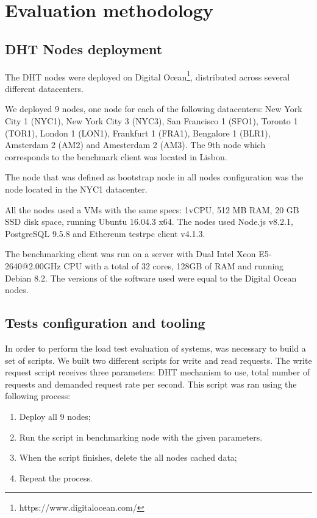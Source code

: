 \section{Evaluation methodology}
\label{section:methodology}

\subsection{DHT Nodes deployment}


The DHT nodes were deployed on Digital Ocean\footnote{https://www.digitalocean.com/}, distributed across several different datacenters.

We deployed 9 nodes, one node for each of the following datacenters: New York City 1 (NYC1), New York City 3 (NYC3), San Francisco 1 (SFO1), Toronto 1 (TOR1), London 1 (LON1), Frankfurt 1 (FRA1), Bengalore 1 (BLR1), Amsterdam 2 (AM2) and Amesterdam 2 (AM3).
The 9th node which corresponds to the benchmark client was located in Lisbon.

The node that was defined as bootstrap node in all nodes configuration was the node located in the NYC1 datacenter.

All the nodes used a \acp{VM} with the same specs: 1vCPU, 512 MB RAM, 20 GB SSD disk space, running Ubuntu 16.04.3 x64.
The nodes used Node.js v8.2.1, PostgreSQL 9.5.8 and Ethereum testrpc client v4.1.3.

The benchmarking client was run on a server with Dual Intel Xeon E5-2640@2.00GHz CPU with a total of 32 cores, 128GB of RAM and running Debian 8.2.
The versions of the software used were equal to the Digital Ocean nodes.

\subsection{Tests configuration and tooling}

In order to perform the load test evaluation of systems, was necessary to build a set of scripts.
We built two different scripts for write and read requests.
The write request script receives three parameters: DHT mechanism to use, total number of requests and demanded request rate per second.
This script was ran using the following process:

\begin{enumerate}
  \item Deploy all 9 nodes;
  \item Run the script in benchmarking node with the given parameters.
  \item When the script finishes, delete the all nodes cached data;
  \item Repeat the process.
\end{enumerate}

